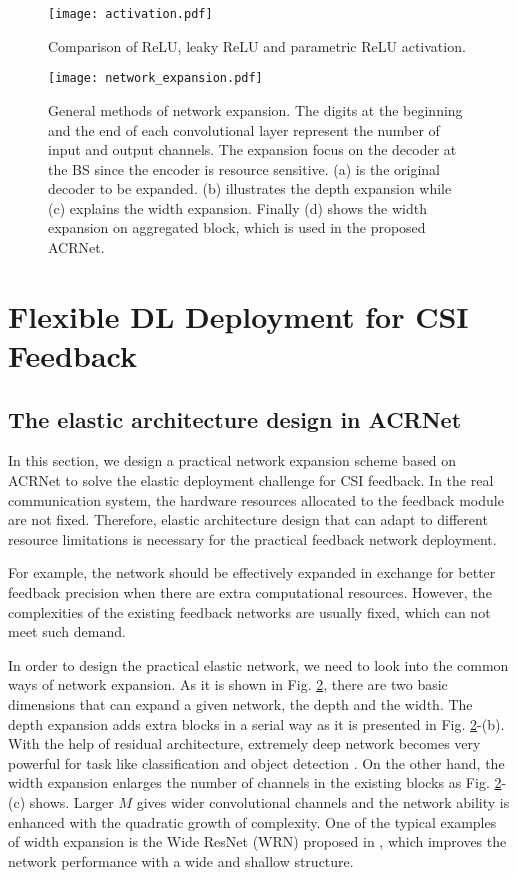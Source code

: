 \documentclass[12pt, draftclsnofoot, onecolumn]{IEEEtran}
\begin{document}
\begin{figure}[!t]
\centering
\texttt{[image: activation.pdf]}
\caption{Comparison of ReLU, leaky ReLU and parametric ReLU activation.}
\label{Activation}
\end{figure}
\begin{figure}[!b]
\centering
\texttt{[image: network\_expansion.pdf]}
\caption{General methods of network expansion. The digits at the beginning and the end of each convolutional layer represent the number of input and output channels. The expansion focus on the decoder at the BS since the encoder is resource sensitive. (a) is the original decoder to be expanded. (b) illustrates the depth expansion while (c) explains the width expansion. Finally (d) shows the width expansion on aggregated block, which is used in the proposed ACRNet.}
\label{Network Expansion}
\end{figure}

\section{Flexible DL Deployment for CSI Feedback} \label{Section4}

\subsection{The elastic architecture design in ACRNet} \label{Section4-1}

In this section, we design a practical network expansion scheme based on ACRNet to solve the elastic deployment challenge for CSI feedback. In the real communication system, the hardware resources allocated to the feedback module are not fixed. Therefore, elastic architecture design that can adapt to different resource limitations is necessary for the practical feedback network deployment.

For example, the network should be effectively expanded in exchange for better feedback precision when there are extra computational resources. However, the complexities of the existing feedback networks are usually fixed, which can not meet such demand.

In order to design the practical elastic network, we need to look into the common ways of network expansion. As it is shown in Fig. \ref{Network Expansion}, there are two basic dimensions that can expand a given network, the depth and the width. The depth expansion adds extra blocks in a serial way as it is presented in Fig. \ref{Network Expansion}-(b). With the help of residual architecture, extremely deep network becomes very powerful for task like classification and object detection \cite{he2016deep}. On the other hand, the width expansion enlarges the number of channels in the existing blocks as Fig. \ref{Network Expansion}-(c) shows. Larger $M$ gives wider convolutional channels and the network ability is enhanced with the quadratic growth of complexity. One of the typical examples of width expansion is the Wide ResNet (WRN) proposed in \cite{sergey2016wide}, which improves the network performance with a wide and shallow structure.
\end{document}
